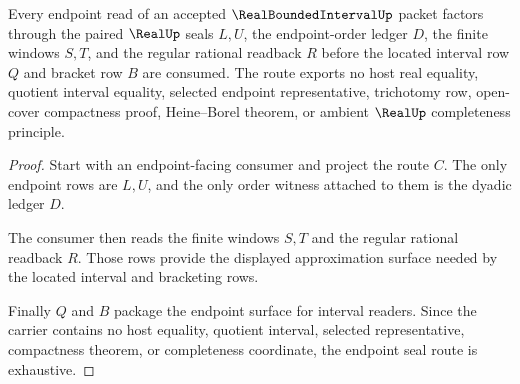 \begin{theorem}
\label{thm:real-bounded-interval-endpoint-seal-route}
Every endpoint read of an accepted $\RealBoundedIntervalUp$ packet factors through the paired $\RealUp$ seals $L,U$, the endpoint-order ledger $D$, the finite windows $S,T$, and the regular rational readback $R$ before the located interval row $Q$ and bracket row $B$ are consumed. The route exports no host real equality, quotient interval equality, selected endpoint representative, trichotomy row, open-cover compactness proof, Heine--Borel theorem, or ambient $\RealUp$ completeness principle.
\end{theorem}
\begin{proof}
Start with an endpoint-facing consumer and project the route $C$. The only endpoint rows are $L,U$, and the only order witness attached to them is the dyadic ledger $D$.

The consumer then reads the finite windows $S,T$ and the regular rational readback $R$. Those rows provide the displayed approximation surface needed by the located interval and bracketing rows.

Finally $Q$ and $B$ package the endpoint surface for interval readers. Since the carrier contains no host equality, quotient interval, selected representative, compactness theorem, or completeness coordinate, the endpoint seal route is exhaustive.
\end{proof}


\begin{closurestatus}{\RealBoundedIntervalUp}
  \theoryclosure{\seedClosure}
  \formalstatus{\unformalizedV}
\end{closurestatus}
